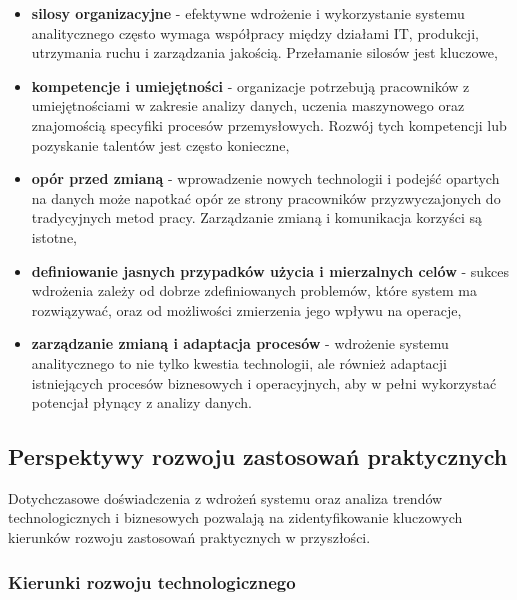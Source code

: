 \begin{itemize}
    \item \textbf{silosy organizacyjne} - efektywne wdrożenie i wykorzystanie systemu analitycznego często wymaga współpracy między działami IT, produkcji, utrzymania ruchu i zarządzania jakością. Przełamanie silosów jest kluczowe,
    \item \textbf{kompetencje i umiejętności} - organizacje potrzebują pracowników z umiejętnościami w zakresie analizy danych, uczenia maszynowego oraz znajomością specyfiki procesów przemysłowych. Rozwój tych kompetencji lub pozyskanie talentów jest często konieczne,
    \item \textbf{opór przed zmianą} - wprowadzenie nowych technologii i podejść opartych na danych może napotkać opór ze strony pracowników przyzwyczajonych do tradycyjnych metod pracy. Zarządzanie zmianą i komunikacja korzyści są istotne,
    \item \textbf{definiowanie jasnych przypadków użycia i mierzalnych celów} - sukces wdrożenia zależy od dobrze zdefiniowanych problemów, które system ma rozwiązywać, oraz od możliwości zmierzenia jego wpływu na operacje,
    \item \textbf{zarządzanie zmianą i adaptacja procesów} - wdrożenie systemu analitycznego to nie tylko kwestia technologii, ale również adaptacji istniejących procesów biznesowych i operacyjnych, aby w pełni wykorzystać potencjał płynący z analizy danych.
\end{itemize}

\subsection{Perspektywy rozwoju zastosowań praktycznych}
\label{subsec:perspektywy_rozwoju}

Dotychczasowe doświadczenia z wdrożeń systemu oraz analiza trendów technologicznych i biznesowych pozwalają na zidentyfikowanie kluczowych kierunków rozwoju zastosowań praktycznych w przyszłości.

\subsubsection{Kierunki rozwoju technologicznego}
\label{subsubsec:kierunki_rozwoju_tech}

